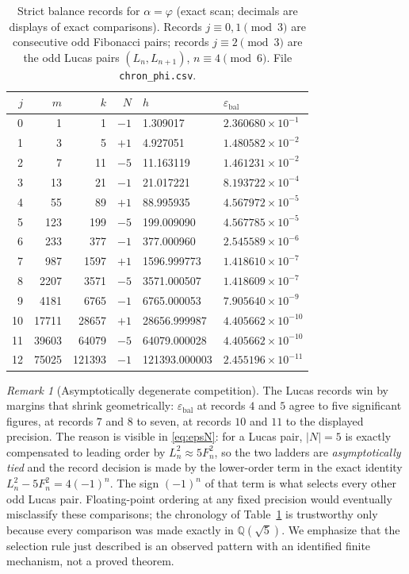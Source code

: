\documentclass[11pt]{article}
\theoremstyle{definition}
\theoremstyle{remark}
\newtheorem{remark}[theorem]{Remark}
\newcommand{\eb}{\varepsilon_{\mathrm{bal}}}
\newcommand{\QQ}{\mathbb{Q}}
\begin{document}
\begin{table}[ht]
\centering
\small
\begin{tabular}{rrrrll}
\hline
$j$ & $m$ & $k$ & $N$ & $h$ & $\eb$ \\
\hline
0 & 1 & 1 & $-1$ & 1.309017 & $2.360680\times10^{-1}$\\
1 & 3 & 5 & $+1$ & 4.927051 & $1.480582\times10^{-2}$\\
2 & 7 & 11 & $-5$ & 11.163119 & $1.461231\times10^{-2}$\\
3 & 13 & 21 & $-1$ & 21.017221 & $8.193722\times10^{-4}$\\
4 & 55 & 89 & $+1$ & 88.995935 & $4.567972\times10^{-5}$\\
5 & 123 & 199 & $-5$ & 199.009090 & $4.567785\times10^{-5}$\\
6 & 233 & 377 & $-1$ & 377.000960 & $2.545589\times10^{-6}$\\
7 & 987 & 1597 & $+1$ & 1596.999773 & $1.418610\times10^{-7}$\\
8 & 2207 & 3571 & $-5$ & 3571.000507 & $1.418609\times10^{-7}$\\
9 & 4181 & 6765 & $-1$ & 6765.000053 & $7.905640\times10^{-9}$\\
10 & 17711 & 28657 & $+1$ & 28656.999987 & $4.405662\times10^{-10}$\\
11 & 39603 & 64079 & $-5$ & 64079.000028 & $4.405662\times10^{-10}$\\
12 & 75025 & 121393 & $-1$ & 121393.000003 & $2.455196\times10^{-11}$\\
\hline
\end{tabular}
\caption{Strict balance records for $\alpha=\varphi$ (exact scan; decimals are displays of exact comparisons). Records $j\equiv0,1\pmod3$ are consecutive odd Fibonacci pairs; records $j\equiv2\pmod3$ are the odd Lucas pairs $(L_n,L_{n+1})$, $n\equiv4\pmod6$. File \texttt{chron\_phi.csv}.}
\label{tab:phi}
\end{table}

\begin{remark}[Asymptotically degenerate competition]\label{rem:degenerate}
The Lucas records win by margins that shrink geometrically: $\eb$ at records $4$ and $5$ agree to five significant figures, at records $7$ and $8$ to seven, at records $10$ and $11$ to the displayed precision. The reason is visible in \eqref{eq:epsN}: for a Lucas pair, $|N|=5$ is exactly compensated to leading order by $L_n^2\approx5F_n^2$, so the two ladders are \emph{asymptotically tied} and the record decision is made by the lower-order term in the exact identity $L_n^2-5F_n^2=4(-1)^n$. The sign $(-1)^n$ of that term is what selects every other odd Lucas pair. Floating-point ordering at any fixed precision would eventually misclassify these comparisons; the chronology of Table~\ref{tab:phi} is trustworthy only because every comparison was made exactly in $\QQ(\sqrt5)$. We emphasize that the selection rule just described is an observed pattern with an identified finite mechanism, not a proved theorem.
\end{remark}
\end{document}
